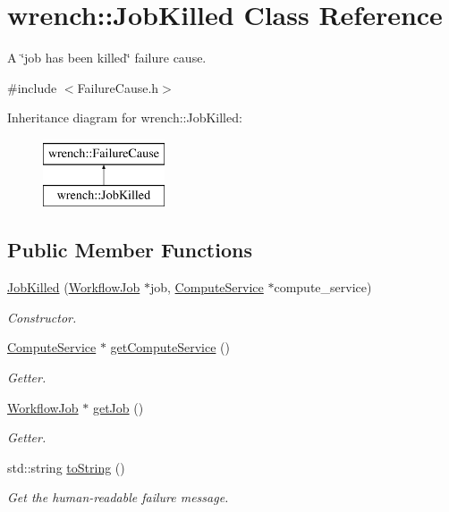 \hypertarget{classwrench_1_1_job_killed}{}\section{wrench\+:\+:Job\+Killed Class Reference}
\label{classwrench_1_1_job_killed}


A \char`\"{}job has been killed\char`\"{} failure cause.  




{\ttfamily \#include $<$Failure\+Cause.\+h$>$}

Inheritance diagram for wrench\+:\+:Job\+Killed\+:\begin{figure}[H]
\begin{center}
\leavevmode
\includegraphics[height=2.000000cm]{classwrench_1_1_job_killed}
\end{center}
\end{figure}
\subsection*{Public Member Functions}
\begin{DoxyCompactItemize}
\item 
\hyperlink{classwrench_1_1_job_killed_ad5c0bc70d61ec91cb91e65b1facdd1b3}{Job\+Killed} (\hyperlink{classwrench_1_1_workflow_job}{Workflow\+Job} $\ast$job, \hyperlink{classwrench_1_1_compute_service}{Compute\+Service} $\ast$compute\+\_\+service)
\begin{DoxyCompactList}\small\item\em Constructor. \end{DoxyCompactList}\item 
\hyperlink{classwrench_1_1_compute_service}{Compute\+Service} $\ast$ \hyperlink{classwrench_1_1_job_killed_a448c858885b28a03399103494ad85e5b}{get\+Compute\+Service} ()
\begin{DoxyCompactList}\small\item\em Getter. \end{DoxyCompactList}\item 
\hyperlink{classwrench_1_1_workflow_job}{Workflow\+Job} $\ast$ \hyperlink{classwrench_1_1_job_killed_a12b56e54f07217a9b0a3f3f67b001132}{get\+Job} ()
\begin{DoxyCompactList}\small\item\em Getter. \end{DoxyCompactList}\item 
std\+::string \hyperlink{classwrench_1_1_job_killed_aa9c6b749d16db4a313ffdd83629f1c76}{to\+String} ()
\begin{DoxyCompactList}\small\item\em Get the human-\/readable failure message. \end{DoxyCompactList}\end{DoxyCompactItemize}
